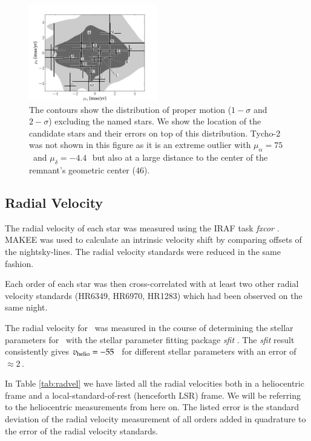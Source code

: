 \begin{figure}[htbp] %
   \centering
   \includegraphics[width=0.5\textwidth]{chapter_sn1572_hires/plots/propmot_distr.pdf}
   \caption{The contours show the distribution of proper motion ($1-\sigma$ and $2-\sigma$) excluding the named stars.
    We show the location of the candidate stars and their errors on top of this distribution. Tycho-2 was not shown in this figure as it is an extreme outlier with $\mu_\alpha=75$\,\masyr\ and $\mu_\delta=-4.4$\,\masyr\ but also at a large distance to the center of the remnant's geometric center (46\arcsec).}
   \label{fig:propmot_sn1572_hires}
\end{figure}


\subsection{Radial Velocity}
\label{sec:radvel}

The radial velocity of each star was measured using the IRAF task \textit{fxcor} \citep{1979AJ.....84.1511T}. MAKEE was used to calculate an intrinsic velocity shift by comparing offsets of the nightsky-lines. The radial velocity standards were reduced in the same fashion. 
 
Each order of each star was then cross-correlated with at least two other radial velocity standards (HR6349, HR6970, HR1283) which had been observed on the same night.


The radial velocity for \starb\ was measured in the course of determining the stellar parameters for \starb\ with the stellar parameter fitting package \textit{sfit} \citesfit. The \textit{sfit} result consistently gives $v_{\textnormal{helio}} = -55$ \kms\ for different stellar parameters with an error of $\approx 2$\,\kms. 


In Table \ref{tab:radvel} we have listed all the radial velocities both in a heliocentric frame and a local-standard-of-rest (henceforth LSR) frame. We will be referring to the heliocentric measurements from here on. The listed error is the standard deviation of the radial velocity measurement of all orders added in quadrature to the error of the radial velocity standards.

